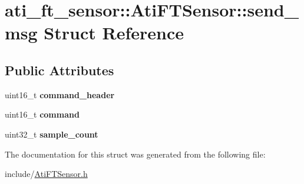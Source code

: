 \hypertarget{structati__ft__sensor_1_1AtiFTSensor_1_1send__msg}{}\section{ati\+\_\+ft\+\_\+sensor\+:\+:Ati\+F\+T\+Sensor\+:\+:send\+\_\+msg Struct Reference}
\label{structati__ft__sensor_1_1AtiFTSensor_1_1send__msg}
\subsection*{Public Attributes}
\begin{DoxyCompactItemize}
\item 
\mbox{\label{structati__ft__sensor_1_1AtiFTSensor_1_1send__msg_a17af1cc1fc1f2c47ec94657b6e2407a4}} 
uint16\+\_\+t {\bfseries command\+\_\+header}
\item 
\mbox{\label{structati__ft__sensor_1_1AtiFTSensor_1_1send__msg_ae0878bfd4d9aa9c4af111b3b0377b5e7}} 
uint16\+\_\+t {\bfseries command}
\item 
\mbox{\label{structati__ft__sensor_1_1AtiFTSensor_1_1send__msg_a37b2211c45156511d0ef4b1c192867b2}} 
uint32\+\_\+t {\bfseries sample\+\_\+count}
\end{DoxyCompactItemize}


The documentation for this struct was generated from the following file\+:\begin{DoxyCompactItemize}
\item 
include/\hyperlink{AtiFTSensor_8h}{Ati\+F\+T\+Sensor.\+h}\end{DoxyCompactItemize}
